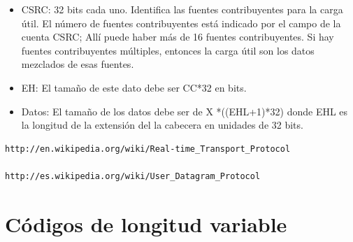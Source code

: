 \begin{itemize}
\item  CSRC: 32 bits cada uno. Identifica las fuentes contribuyentes para la carga útil. El número de fuentes contribuyentes está indicado por el campo de la cuenta CSRC; Allí puede haber más de 16 fuentes contribuyentes. Si hay fuentes contribuyentes múltiples, entonces la carga útil son los datos mezclados de esas fuentes.


\item EH: El tamaño de este dato debe ser CC*32 en bits.

\item Datos: El tamaño de los datos debe ser de X *((EHL+1)*32) donde EHL es la longitud de la extensión del la cabecera en unidades de 32 bits.

\end{itemize}

\begin{verbatim}
http://en.wikipedia.org/wiki/Real-time_Transport_Protocol

http://es.wikipedia.org/wiki/User_Datagram_Protocol

\end{verbatim}



\section{Códigos de longitud variable}


